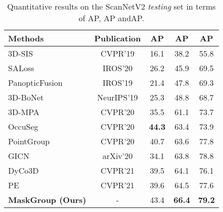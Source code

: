 \documentclass{article}
\begin{document}
\begin{table}
	\centering
	\small
	\caption{Quantitative results on the ScanNetV2 \textit{testing} set in terms of AP, AP andAP.}	\begin{tabular}{l|c|c|c|c}
		\toprule
		Methods & Publication & AP  & AP  & AP \\
		\midrule
		3D-SIS~\cite{3dsis} & CVPR'19 &16.1 &38.2 & 55.8 \\
		SALoss~\cite{saloss} & IROS'20 &26.2  &45.9 &69.5 \\
		PanopticFusion~\cite{pfusion} & IROS'19 &21.4 &47.8 & 69.3 \\
		3D-BoNet~\cite{3dbonet} & NeurIPS'19 & 25.3 & 48.8 & 68.7 \\
		3D-MPA~\cite{3dmpa} & CVPR'20 & 35.5 &	61.1	&	73.7	\\
		OccuSeg~\cite{occseg} & CVPR'20 & \textbf{44.3} & {63.4} & {73.9} \\
		PointGroup~\cite{pointgroup} & CVPR'20 & {40.7} & {63.6} &{77.8} \\
		GICN~\cite{gicn} & arXiv'20 & {34.1} & {63.8} & {78.8} \\
		{DyCo3D}~\cite{dyco} & CVPR'21 &39.5 &{64.1} &{76.1}\\
		PE~\cite{pe} & CVPR'21 &39.6 &64.5 &77.6 \\
		\hline
		\bf {MaskGroup (Ours)} & -  & {43.4} & \textbf{66.4} & \textbf{79.2} \\
		\bottomrule
	\end{tabular}
	\label{tab:performance_scannet}
	\vspace{-6mm}
\end{table}
\end{document}
